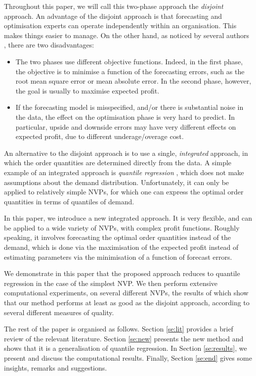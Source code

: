\documentclass{article}
\begin{document}
Throughout this paper, we will call this two-phase approach the \emph{disjoint} approach. An advantage of the disjoint approach is that forecasting and optimisation experts can operate independently within an organisation. This makes things easier to manage. On the other hand, as noticed by several authors \cite{BT06,BM12,Ka94,KT96,KTB20}, there are two disadvantages:
\begin{itemize}
\item The two phases use different objective functions. Indeed, in the first phase, the objective is to minimise a function of the forecasting errors, such as the root mean square error or mean absolute error. In the second phase, however, the goal is usually to maximise expected profit.
\item If the forecasting model is misspecified, and/or there is substantial noise in the data, the effect on the optimisation phase is very hard to predict. In particular, upside and downside errors may have very different effects on expected profit, due to different underage/overage cost.
\end{itemize}

An alternative to the disjoint approach is to use a single, \textit{integrated} approach, in which the order quantities are determined directly from the data. A simple example of an integrated approach is \emph{quantile regression} \cite{Br16,Hu19}, which does not make assumptions about the demand distribution. Unfortunately, it can only be applied to relatively simple NVPs, for which one can express the optimal order quantities in terms of quantiles of demand.

In this paper, we introduce a new integrated approach. It is very flexible, and can be applied to a wide variety of NVPs, with complex profit functions. Roughly speaking, it involves forecasting the optimal order quantities instead of the demand, which is done via the maximisation of the expected profit instead of estimating parameters via the minimisation of a function of forecast errors.

We demonstrate in this paper that the proposed approach reduces to quantile regression in the case of the simplest NVP. We then perform extensive computational experiments, on several different NVPs, the results of which show that our method performs at least as good as the disjoint approach, according to several different measures of quality.

The rest of the paper is organised as follows. Section \ref{se:lit} provides a brief review of the relevant literature. Section \ref{se:new} presents the new method and shows that it is a generalisation of quantile regression. In Section \ref{se:results}, we present and discuss the computational results. Finally, Section \ref{se:end} gives some insights, remarks and suggestions.
\end{document}
